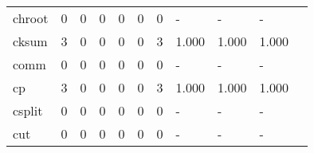\begin{longtable}{lp{1.2cm}p{1.2cm}p{1.2cm}p{1.2cm}p{1.2cm}p{1.2cm}p{1.2cm}p{1.2cm}p{1.2cm}p{1.2cm}}
chroot    &                                     0 &                                                  0 &                                                  0 &                                                  0 &                                                  0 &                                                  0 &                                                  - &                                                  - &                                                  - \\
cksum     &                                     3 &                                                  0 &                                                  0 &                                                  0 &                                                  0 &                                                  3 &                                              1.000 &                                              1.000 &                                              1.000 \\
comm      &                                     0 &                                                  0 &                                                  0 &                                                  0 &                                                  0 &                                                  0 &                                                  - &                                                  - &                                                  - \\
cp        &                                     3 &                                                  0 &                                                  0 &                                                  0 &                                                  0 &                                                  3 &                                              1.000 &                                              1.000 &                                              1.000 \\
csplit    &                                     0 &                                                  0 &                                                  0 &                                                  0 &                                                  0 &                                                  0 &                                                  - &                                                  - &                                                  - \\
cut       &                                     0 &                                                  0 &                                                  0 &                                                  0 &                                                  0 &                                                  0 &                                                  - &                                                  - &                                                  - \\

\end{longtable}
